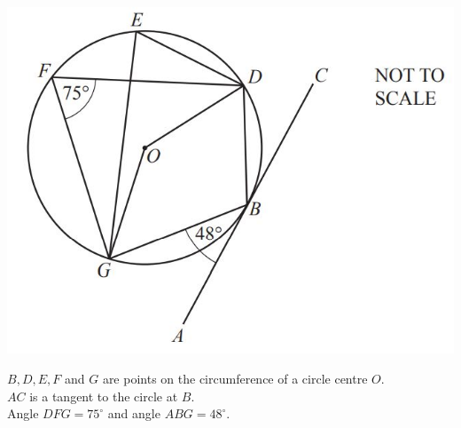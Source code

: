 \newpage
\question ~\\
\begin{center}
        \includegraphics[scale=0.6]{Questions/quiz 19/images/9.JPG}
\end{center} 
$B, D, E, F$ and $G$ are points on the circumference of a circle centre $O$.\\
$A C$ is a tangent to the circle at $B$.\\
Angle $D F G=75^{\circ}$ and angle $A B G=48^{\circ}$.\\
